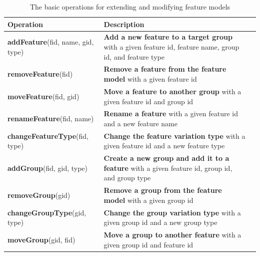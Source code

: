 \documentclass[a4paper,english]{ifimaster}
\begin{document}
\begin{centering}
  \begin{table}
    \begin{tabularx}{\textwidth}{|l|X|X|}
      \hline
      \textbf{Operation} & \textbf{Description}  & \\
      \hline
      \textbf{addFeature}(fid, name, gid, type) &  \textbf{Add a new feature to a target \newline group} \newline with a given feature id, \newline feature name, group id, \newline and feature type  & \\
      \hline
      \textbf{removeFeature}(fid) & \textbf{Remove a feature from the feature \newline model} \newline with a given feature id  & \\
      \hline
      \textbf{moveFeature}(fid, gid) & \textbf{Move a feature to another group} \newline with a given feature id and group id  & \\
      \hline
      \textbf{renameFeature}(fid, name) & \textbf{Rename a feature} \newline with a given feature id and a new \newline feature name  & \\
      \hline
      \textbf{changeFeatureType}(fid, type) & \textbf{Change the feature variation type} \newline with a given feature id and  a new \newline feature type  & \\
      \hline
      \textbf{addGroup}(fid, gid, type) & \textbf{Create a new group and add it \newline to a feature}  \newline with a given feature id, group id, \newline and group type  & \\
      \hline
      \textbf{removeGroup}(gid) & \textbf{Remove a group from the feature \newline model} \newline with a given group id  & \\
      \hline
      \textbf{changeGroupType}(gid, type) & \textbf{Change the group variation type} \newline with a given group id and a new \newline group type  & \\
      \hline
      \textbf{moveGroup}(gid, fid) & \textbf{Move a group to another feature} \newline with a given group id and feature id  & \\
      \hline
    \end{tabularx}
    \caption{The basic operations for extending and modifying feature models}
    \label{table:operations}
  \end{table}
\end{centering}
\end{document}
